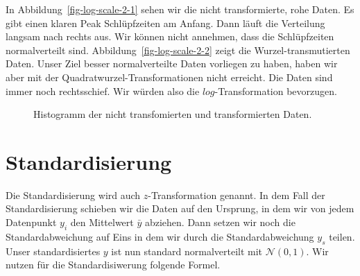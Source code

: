 \documentclass[
  letterpaper,
]{scrbook}
\begin{document}
In Abbildung~\ref{fig-log-scale-2-1} sehen wir die nicht transformierte,
rohe Daten. Es gibt einen klaren Peak Schlüpfzeiten am Anfang. Dann
läuft die Verteilung langsam nach rechts aus. Wir können nicht annehmen,
dass die Schlüpfzeiten normalverteilt sind.
Abbildung~\ref{fig-log-scale-2-2} zeigt die Wurzel-transmutierten Daten.
Unser Ziel besser normalverteilte Daten vorliegen zu haben, haben wir
aber mit der Quadratwurzel-Transformationen nicht erreicht. Die Daten
sind immer noch rechtsschief. Wir würden also die \(log\)-Transformation
bevorzugen.

\begin{figure}

\begin{minipage}[t]{0.50\linewidth}

{\centering 


}

\end{minipage}%
%
\begin{minipage}[t]{0.50\linewidth}

{\centering 


}

\end{minipage}%

\caption{\label{fig-log-scale-2}Histogramm der nicht transfomierten und
transformierten Daten.}

\end{figure}

\hypertarget{standardisierung}{%
\section{Standardisierung}\label{standardisierung}}

Die Standardisierung wird auch \(z\)-Transformation genannt. In dem Fall
der Standardisierung schieben wir die Daten auf den Ursprung, in dem wir
von jedem Datenpunkt \(y_i\) den Mittelwert \(\bar{y}\) abziehen. Dann
setzen wir noch die Standardabweichung auf Eins in dem wir durch die
Standardabweichung \(y_s\) teilen. Unser standardisiertes \(y\) ist nun
standard normalverteilt mit \(\mathcal{N(0,1)}\). Wir nutzen für die
Standardisiwerung folgende Formel.
\end{document}
